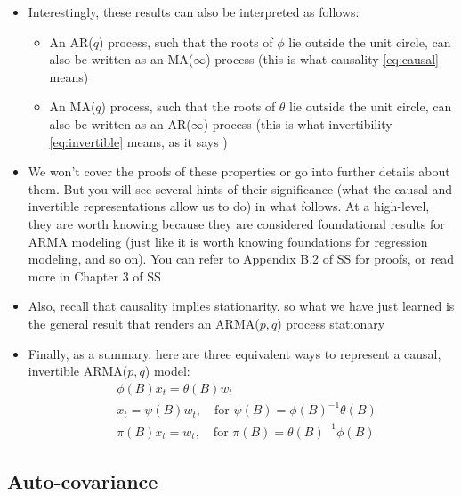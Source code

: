 \documentclass{article}
\begin{document}
\begin{itemize}
\item Interestingly, these results can also be interpreted as follows:
  \begin{itemize}
  \item An AR($q$) process, such that the roots of $\phi$ lie outside the unit
    circle, can also be written as an MA($\infty$) process (this is what
    causality \eqref{eq:causal} means)

  \item An MA($q$) process, such that the roots of $\theta$ lie outside the 
  unit circle, can also be written as an AR($\infty$) process (this is what 
  invertibility \eqref{eq:invertible} means, as it says
  )
  \end{itemize}

\item We won't cover the proofs of these properties or go into further details
  about them. But you will see several hints of their significance (what the
  causal and invertible representations allow us to do) in what follows. At 
  a high-level, they are worth knowing because they are considered foundational 
  results for ARMA modeling (just like it is worth knowing foundations for 
  regression modeling, and so on). You can refer to Appendix B.2 of SS for
  proofs, or read more in Chapter 3 of SS

\item Also, recall that causality implies stationarity, so what we have just
  learned is the general result that renders an ARMA($p,q$) process stationary 

\item Finally, as a summary, here are three equivalent ways to represent a
  causal, invertible ARMA($p,q$) model:
  \begin{align*}
  &\phi(B) x_t = \theta(B) w_t \\
  &x_t = \psi(B) w_t, \quad \text{for $\psi(B) = \phi(B)^{-1} \theta(B)$} \\ 
  &\pi(B) x_t = w_t, \quad \text{for $\pi(B) = \theta(B)^{-1} \phi(B)$} 
  \end{align*}
\end{itemize}

\subsection{Auto-covariance}
\end{document}
